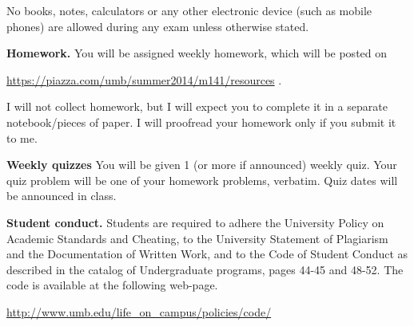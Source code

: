 \documentclass{article}
\begin{document}
No books, notes, calculators or any other electronic device (such as mobile phones) are allowed during any exam unless otherwise stated.

\medskip
\noindent \textbf{Homework.} You will be assigned weekly homework, which will be posted on

\url{https://piazza.com/umb/summer2014/m141/resources} \quad \quad \quad .

\noindent I will not collect homework, but I will expect you to complete it in a separate notebook/pieces of paper. I will proofread your homework only if you submit it to me.
 
 \medskip
\noindent \textbf{Weekly quizzes} You will be given 1 (or more if announced) weekly quiz. Your quiz problem will be one of your homework problems, verbatim. Quiz dates will be announced in class. 



\medskip
\noindent \textbf{Student conduct.} Students  are required to adhere the University Policy on Academic Standards and Cheating, to the University Statement of Plagiarism and the Documentation of Written Work, and to the Code of Student Conduct as described in the catalog of Undergraduate programs, pages 44-45 and 48-52. The code is available at the following web-page.

\noindent\url{http://www.umb.edu/life_on_campus/policies/code/}
\end{document}
